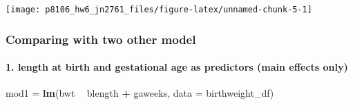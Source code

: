 \documentclass[]{article}
\newenvironment{Shaded}{\begin{snugshade}}{\end{snugshade}}
\newcommand{\DataTypeTok}[1]{\textcolor[rgb]{0.13,0.29,0.53}{#1}}
\newcommand{\KeywordTok}[1]{\textcolor[rgb]{0.13,0.29,0.53}{\textbf{#1}}}
\newcommand{\NormalTok}[1]{#1}
\newcommand{\OperatorTok}[1]{\textcolor[rgb]{0.81,0.36,0.00}{\textbf{#1}}}
\newcommand{\StringTok}[1]{\textcolor[rgb]{0.31,0.60,0.02}{#1}}
\let\oldparagraph\paragraph
\renewcommand{\paragraph}[1]{\oldparagraph{#1}\mbox{}}
\begin{document}
\begin{Shaded}
\end{Shaded}

\texttt{[image: p8106\_hw6\_jn2761\_files/figure-latex/unnamed-chunk-5-1]}

\hypertarget{comparing-with-two-other-model}{%
\subsubsection{Comparing with two other
model}\label{comparing-with-two-other-model}}

\hypertarget{length-at-birth-and-gestational-age-as-predictors-main-effects-only}{%
\paragraph{1. length at birth and gestational age as predictors (main
effects
only)}\label{length-at-birth-and-gestational-age-as-predictors-main-effects-only}}

\begin{Shaded}
\begin{Highlighting}[]
\NormalTok{mod1 =}\StringTok{ }\KeywordTok{lm}\NormalTok{(bwt }\OperatorTok{~}\StringTok{ }\NormalTok{blength }\OperatorTok{+}\StringTok{ }\NormalTok{gaweeks, }\DataTypeTok{data =}\NormalTok{ birthweight_df)}
\end{Highlighting}
\end{Shaded}
\end{document}

